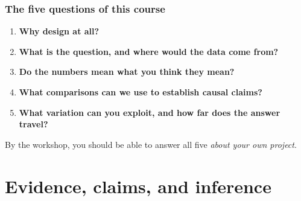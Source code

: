 \begin{frame}
\frametitle{The five questions of this course}
\centering

\vspace{5pt}
\small
\begin{enumerate}
  \item \textbf{Why design at all?} 
  \vspace{6pt}
  \item \textbf{What is the question, and where would the data come from?}
  \vspace{6pt}
  \item \textbf{Do the numbers mean what you think they mean?}
  \vspace{6pt}
  \item \textbf{What comparisons can we use to establish causal claims?}
  \vspace{6pt}
  \item \textbf{What variation can you exploit, and how far does the answer travel?}
\end{enumerate}

\vspace{10pt}
\begin{flushleft}
\footnotesize By the workshop, you should be able to answer all five \textit{about your own project}.
\end{flushleft}

\end{frame}

\section{Evidence, claims, and inference}

